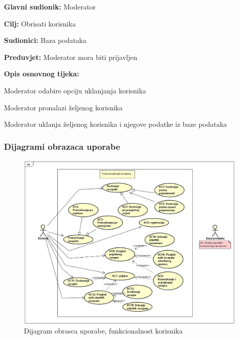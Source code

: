 \noindent {}
\begin{packed_item}

	\item \textbf{Glavni sudionik: } Moderator
	\item  \textbf{Cilj:} Obrisati korisnika
	\item  \textbf{Sudionici:} Baza podataka
	\item  \textbf{Preduvjet:} Moderator mora biti prijavljen
	\item  \textbf{Opis osnovnog tijeka:}

	\item[] \begin{packed_enum}

		\item Moderator odabire opciju uklanjanja korisnika
		\item Moderator pronalazi željenog korisnika
		\item Moderator uklanja željenog korisnika i njegove podatke iz baze podataka \newline \newline \newline \newline \newline \newline \newline \newline \newline \newline \newline \newline
	\end{packed_enum}
\end{packed_item}

\subsubsection{Dijagrami obrazaca uporabe}

\begin{figure}[H]
	\includegraphics[scale=0.8]{slike/Slika5.jpg} %
	\centering
	\caption{Dijagram obrasca uporabe, funkcionalnost korisnika}
	\label{fig:promjene}
\end{figure}


